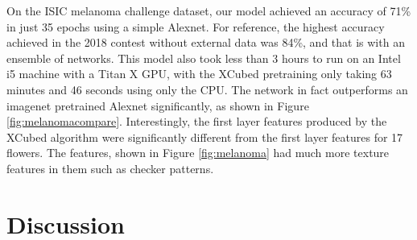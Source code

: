 \documentclass[twocolumn]{article}
\begin{document}
On the ISIC melanoma challenge dataset\cite{melanoma1}\cite{melanoma2}, our model achieved an accuracy of 71\% in just 35 epochs using a simple Alexnet. For reference, the highest accuracy achieved in the 2018 contest without external data was 84\%, and that is with an ensemble of networks. This model also took less than 3 hours to run on an Intel i5 machine with a Titan X GPU, with the XCubed pretraining only taking 63 minutes and 46 seconds using only the CPU. The network in fact outperforms an imagenet pretrained Alexnet significantly, as shown in Figure \ref{fig:melanomacompare}. Interestingly, the first layer features produced by the XCubed algorithm were significantly different from the first layer features for 17 flowers. The features, shown in Figure \ref{fig:melanoma} had much more texture features in them such as checker patterns.
\section{Discussion}


\end{document}
